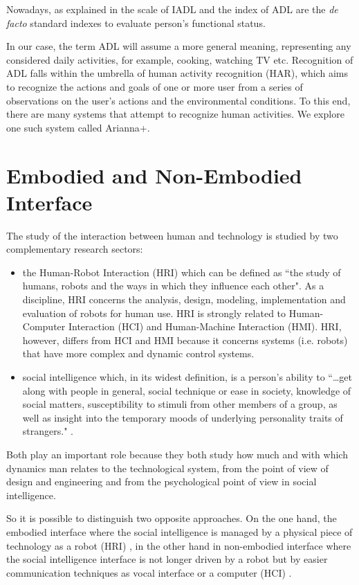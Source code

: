 \documentclass{thesisreport}
\begin{document}
Nowadays, as explained in \cite{bruno2014public} the scale of IADL and the index of ADL are the \textit{de facto} standard indexes to evaluate person’s functional status\cite{buoncompagni2017towards}. 

In our case, the term ADL will assume a more general meaning, representing any  considered daily activities, for example, cooking, watching TV etc.
Recognition of ADL falls within the umbrella of human activity recognition (HAR), which aims to recognize the actions and goals of one or more user from a series of observations on the user's actions and the environmental conditions. To this end, there are many systems that attempt to recognize human activities. We explore one such system called Arianna+.


\section{Embodied and Non-Embodied Interface}
 The study of the interaction between human and technology is studied by two complementary research sectors:
 \begin{itemize}
    \item the Human-Robot Interaction (HRI) which can be defined as ``the study of humans, robots and the ways in which they influence each other". As a discipline, HRI concerns the analysis, design, modeling, implementation and evaluation of robots for human use.
    HRI is strongly related to Human-Computer Interaction (HCI) and Human-Machine Interaction (HMI). HRI, however, differs from HCI and HMI because it concerns systems (i.e. robots) that have more complex and dynamic control systems.
     
    \item social intelligence which, in its widest definition, is a person's ability to ``\dots get along with people in general, social technique or ease in society, knowledge of social matters, susceptibility to stimuli from other members of a group, as well as insight into the temporary moods of underlying personality traits of strangers." \cite{vernon1933some}.
 \end{itemize}

 Both play an important role because they both study how much and with which dynamics man relates to the technological system, from the point of view of design and engineering and from the psychological point of view in social intelligence. 
 
 So it is possible to distinguish two opposite approaches. On the one hand, the embodied interface where the social intelligence is managed by a physical piece of technology as a robot (HRI) \cite{lakkaraju2016interpretable, antle2009human, feil2005multi}, in the other hand in non-embodied interface where the social intelligence interface is not longer driven by a robot but by easier communication techniques as vocal interface or a computer (HCI) \cite{antle2009human, feil2005multi}.  
\end{document}
